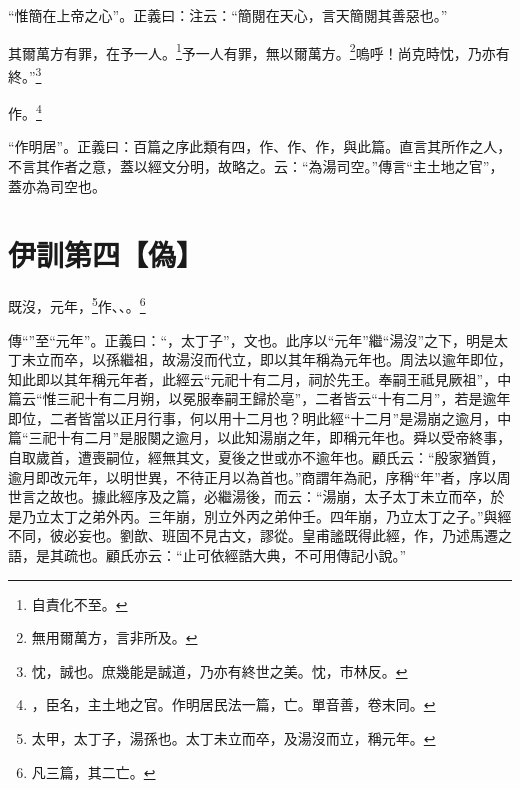 {\noindent\shu{}\fzkt “惟簡在上帝之心”。正義曰：注云：“簡閱在天心，言天簡閱其善惡也。” \par}

其爾萬方有罪，在予一人。\footnote{自責化不至。}予一人有罪，無以爾萬方。\footnote{無用爾萬方，言非所及。}嗚呼！尚克時忱，乃亦有終。”\footnote{忱，誠也。庶幾能是誠道，乃亦有終世之美。忱，市林反。}

作。\footnote{，臣名，主土地之官。作明居民法一篇，亡。單音善，卷末同。}

{\noindent\shu{}\fzkt “作明居”。正義曰：百篇之序此類有四，作、作、作，與此篇。直言其所作之人，不言其作者之意，蓋以經文分明，故略之。云：“為湯司空。”傳言“主土地之官”，蓋亦為司空也。 \par}

\section{伊訓第四【偽】}


既沒，元年，\footnote{太甲，太丁子，湯孫也。太丁未立而卒，及湯沒而立，稱元年。}作、、。\footnote{凡三篇，其二亡。}


{\noindent\zhuan{}\fzbyks 傳“”至“元年”。正義曰：“，太丁子”，文也。此序以“元年”繼“湯沒”之下，明是太丁未立而卒，以孫繼祖，故湯沒而代立，即以其年稱為元年也。周法以逾年即位，知此即以其年稱元年者，此經云“元祀十有二月，祠於先王。奉嗣王祗見厥祖”，中篇云“惟三祀十有二月朔，以冕服奉嗣王歸於亳”，二者皆云“十有二月”，若是逾年即位，二者皆當以正月行事，何以用十二月也？明此經“十二月”是湯崩之逾月，中篇“三祀十有二月”是服闋之逾月，以此知湯崩之年，即稱元年也。舜以受帝終事，自取歲首，遭喪嗣位，經無其文，夏後之世或亦不逾年也。顧氏云：“殷家猶質，逾月即改元年，以明世異，不待正月以為首也。”商謂年為祀，序稱“年”者，序以周世言之故也。據此經序及之篇，必繼湯後，而云：“湯崩，太子太丁未立而卒，於是乃立太丁之弟外丙。三年崩，別立外丙之弟仲壬。四年崩，乃立太丁之子。”與經不同，彼必妄也。劉歆、班固不見古文，謬從。皇甫謐既得此經，作，乃述馬遷之語，是其疏也。顧氏亦云：“止可依經誥大典，不可用傳記小說。” \par}

